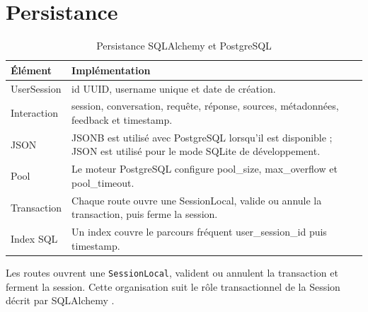 \section{Persistance}
\begin{table}[H]
\centering
\caption{Persistance SQLAlchemy et PostgreSQL}
\label{tab:persistence_impl_ch6}
\begin{tabular}{p{3.5cm}p{9.7cm}}
\toprule
\textbf{Élément} & \textbf{Implémentation} \\
\midrule
UserSession & id UUID, username unique et date de création. \\
Interaction & session, conversation, requête, réponse, sources, métadonnées, feedback et timestamp. \\
JSON & JSONB est utilisé avec PostgreSQL lorsqu’il est disponible ; JSON est utilisé pour le mode SQLite de développement. \\
Pool & Le moteur PostgreSQL configure pool\_size, max\_overflow et pool\_timeout. \\
Transaction & Chaque route ouvre une SessionLocal, valide ou annule la transaction, puis ferme la session. \\
Index SQL & Un index couvre le parcours fréquent user\_session\_id puis timestamp. \\
\bottomrule
\end{tabular}
\end{table}

Les routes ouvrent une \texttt{SessionLocal}, valident ou annulent la transaction et ferment la session. Cette organisation suit le rôle transactionnel de la Session décrit par SQLAlchemy \citep{SQLAlchemySession2026}.

